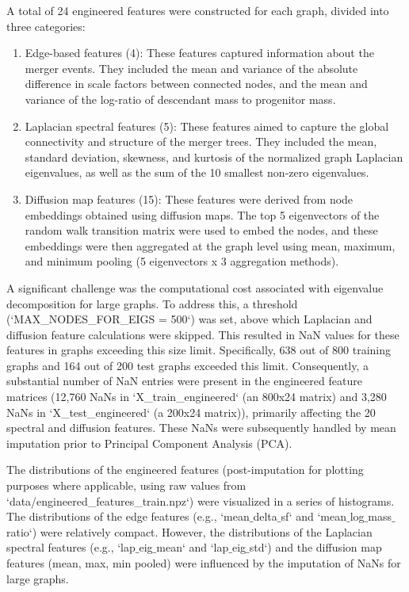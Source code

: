 \documentclass[twocolumn]{aastex631}
\begin{document}
A total of 24 engineered features were constructed for each graph, divided into three categories:
\begin{enumerate}
    \item Edge-based features (4): These features captured information about the merger events. They included the mean and variance of the absolute difference in scale factors between connected nodes, and the mean and variance of the log-ratio of descendant mass to progenitor mass.
    \item Laplacian spectral features (5): These features aimed to capture the global connectivity and structure of the merger trees. They included the mean, standard deviation, skewness, and kurtosis of the normalized graph Laplacian eigenvalues, as well as the sum of the 10 smallest non-zero eigenvalues.
    \item Diffusion map features (15): These features were derived from node embeddings obtained using diffusion maps. The top 5 eigenvectors of the random walk transition matrix were used to embed the nodes, and these embeddings were then aggregated at the graph level using mean, maximum, and minimum pooling (5 eigenvectors x 3 aggregation methods).
\end{enumerate}

A significant challenge was the computational cost associated with eigenvalue decomposition for large graphs. To address this, a threshold (`MAX_NODES_FOR_EIGS = 500`) was set, above which Laplacian and diffusion feature calculations were skipped. This resulted in NaN values for these features in graphs exceeding this size limit. Specifically, 638 out of 800 training graphs and 164 out of 200 test graphs exceeded this limit. Consequently, a substantial number of NaN entries were present in the engineered feature matrices (12,760 NaNs in `X_train_engineered` (an 800x24 matrix) and 3,280 NaNs in `X_test_engineered` (a 200x24 matrix)), primarily affecting the 20 spectral and diffusion features. These NaNs were subsequently handled by mean imputation prior to Principal Component Analysis (PCA).

The distributions of the engineered features (post-imputation for plotting purposes where applicable, using raw values from `data/engineered_features_train.npz`) were visualized in a series of histograms. The distributions of the edge features (e.g., `mean\ensuremath{\_}delta\ensuremath{\_}sf` and `mean\ensuremath{\_}log\ensuremath{\_}mass\ensuremath{\_}ratio`) were relatively compact. However, the distributions of the Laplacian spectral features (e.g., `lap\ensuremath{\_}eig\ensuremath{\_}mean` and `lap\ensuremath{\_}eig\ensuremath{\_}std`) and the diffusion map features (mean, max, min pooled) were influenced by the imputation of NaNs for large graphs.
\end{document}
